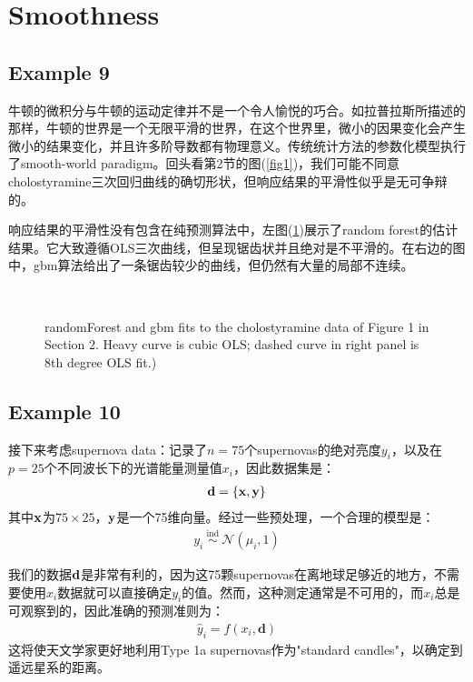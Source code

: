 \documentclass[lang=cn,11pt,a4paper,cite=authoryear]{elegantpaper}
\begin{document}
\section{Smoothness}

\subsection{Example 9}

牛顿的微积分与牛顿的运动定律并不是一个令人愉悦的巧合。如拉普拉斯所描述的那样，牛顿的世界是一个无限平滑的世界，在这个世界里，微小的因果变化会产生微小的结果变化，并且许多阶导数都有物理意义。传统统计方法的参数化模型执行了smooth-world paradigm。回头看第2节的图(\ref{fig1})，我们可能不同意cholostyramine三次回归曲线的确切形状，但响应结果的平滑性似乎是无可争辩的。

响应结果的平滑性没有包含在纯预测算法中，左图(\ref{fig12})展示了random forest的估计结果。它大致遵循OLS三次曲线，但呈现锯齿状并且绝对是不平滑的。在右边的图中，gbm算法给出了一条锯齿较少的曲线，但仍然有大量的局部不连续。

\begin{figure}[H]
		\centering
		\\
		\caption{randomForest and gbm fits to the cholostyramine data of Figure 1 in Section 2. Heavy curve is cubic OLS; dashed curve in right panel is 8th degree OLS fit.)}
		\label{fig12}
\end{figure}

\subsection{Example 10}

接下来考虑supernova data：记录了$n=75$个supernovas的绝对亮度$y_i$，以及在$p=25$个不同波长下的光谱能量测量值$x_i$，因此数据集是：
\begin{align}
\label{supernova data}
	\bold{d} = \{\bold{x}, \bold{y} \}
\end{align}
其中$\bold{x}$为$75 \times 25	$，$\bold{y}$是一个75维向量。经过一些预处理，一个合理的模型是：
\begin{align}
y_{i} \stackrel{\text { ind }}{\sim} \mathcal{N}\left(\mu_{i}, 1\right)
\end{align}

我们的数据$\bold{d}$是非常有利的，因为这75颗supernovas在离地球足够近的地方，不需要使用$x_i$数据就可以直接确定$y_i$的值。然而，这种测定通常是不可用的，而$x_i$总是可观察到的，因此准确的预测准则为：
\begin{align}
\hat{y}_{i}=f\left(x_{i}, \mathbf{d}\right)
\end{align}
这将使天文学家更好地利用Type 1a supernovas作为"standard candles"，以确定到遥远星系的距离。
\end{document}
